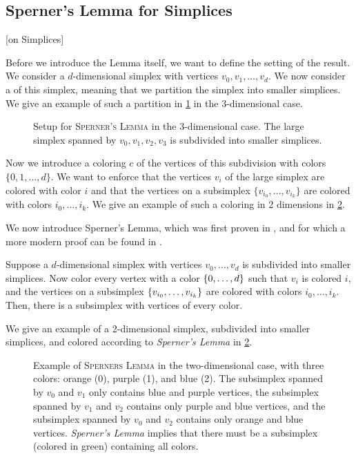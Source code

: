 \subsection{Sperner's Lemma for Simplices}[on Simplices]

Before we introduce the Lemma itself, we want to define the setting of the result. We consider a $d$-dimensional simplex with vertices $v_0, v_1, \dots, v_d$. We now consider a  of this simplex, meaning that we partition the simplex into smaller simplices. We give an example of such a partition in \cref{fig:sperner_setup_example} in the 3-dimensional case.

\begin{figure}[ht]
	\centering
	\caption[Setup for \textsc{Sperner's Lemma}]{Setup for \textsc{Sperner's Lemma} in the 3-dimensional case. The large simplex spanned by $v_0, v_1, v_2, v_3$ is subdivided into smaller simplices.}
	\label{fig:sperner_setup_example}
\end{figure}

Now we introduce a coloring $c$ of the vertices of this subdivision with colors $\{0, 1, \dots, d\}$. We want to enforce that the vertices $v_i$ of the large simplex are colored with color $i$ and that the vertices on a subsimplex $\{v_{i_0}, \dots, v_{i_k}\}$ are colored with colors $i_0, \dots, i_k$. We give an example of such a coloring in 2 dimensions in \cref{fig:sperner_lemma_example}.

We now introduce Sperner's Lemma, which was first proven in , and for which a more modern proof can be found in .
\begin{theorem}
	Suppose a $d$-dimensional simplex with vertices $v_0, \dots, v_d$ is subdivided into smaller simplices. Now color every vertex with a color $\left\{0, \dots, d\right\}$ such that $v_i$ is colored $i$, and the vertices on a subsimplex $\left\{v_{i_0}, \dots, v_{i_k}\right\}$ are colored with colors $i_0, \dots, i_k$. Then, there is a subsimplex with vertices of every color.
\end{theorem}

We give an example of a 2-dimensional simplex, subdivided into smaller simplices, and colored according to \textit{Sperner's Lemma} in \cref{fig:sperner_lemma_example}.

\begin{figure}[ht]
	\centering
	\caption[Example of \textsc{Sperners Lemma}]{Example of \textsc{Sperners Lemma} in the two-dimensional case, with three colors: orange (0), purple (1), and blue (2). The subsimplex spanned by $v_0$ and $v_1$ only contains blue and purple vertices, the subsimplex spanned by $v_1$ and $v_2$ contains only purple and blue vertices, and the subsimplex spanned by $v_0$ and $v_2$ contains only orange and blue vertices. \textit{Sperner's Lemma} implies that there must be a subsimplex (colored in green) containing all colors.}
	\label{fig:sperner_lemma_example}
\end{figure}

